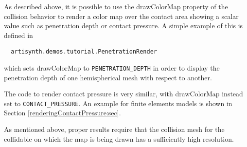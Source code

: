 As described above, it is possible to use the {\sf drawColorMap}
property of the collision behavior to render a color map over the
contact area showing a scalar value such as penetration depth or
contact pressure. A simple example of this is defined in
%
\begin{verbatim}
  artisynth.demos.tutorial.PenetrationRender
\end{verbatim}
%
which sets {\sf drawColorMap} to {\tt PENETRATION\_DEPTH} in order to
display the penetration depth of one hemispherical mesh with respect
to another. 

\begin{sideblock}
The code to render contact pressure is very similar, with {\sf
drawColorMap} instead set to {\tt CONTACT\_PRESSURE}.  An example for
finite elements models is shown in Section
\ref{renderingContactPressure:sec}.
\end{sideblock}

\begin{sideblock}
As mentioned above, proper results require that the collision mesh for
the collidable on which the map is being drawn has a sufficiently high
resolution.
\end{sideblock}

